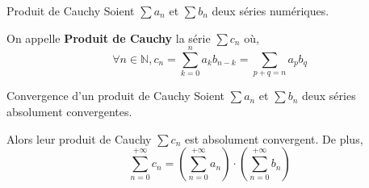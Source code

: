        \begin{defi}{Produit de Cauchy}{}
            Soient $\sum a_n$ et $\sum b_n$ deux séries numériques. 
    
            On appelle \textbf{Produit de Cauchy} la série $\sum c_n$ où, 
            \[ \forall n \in \mathbb{N}, c_n = \sum_{k=0}^{n} a_k b_{n-k} = \sum_{p+q = n} a_p b_q \] 
        \end{defi}

        \begin{prop}{Convergence d’un produit de Cauchy}{}
            Soient $\sum a_n$ et $\sum b_n$ deux séries absolument convergentes.
    
            Alors leur produit de Cauchy $\sum c_n$ est absolument convergent. De plus, 
            \[ \sum_{n=0}^{+\infty} c_n = \left(\sum_{n=0}^{+\infty} a_n\right) \cdot \left(\sum_{n=0}^{+\infty} b_n\right) \]
        \end{prop}
    
